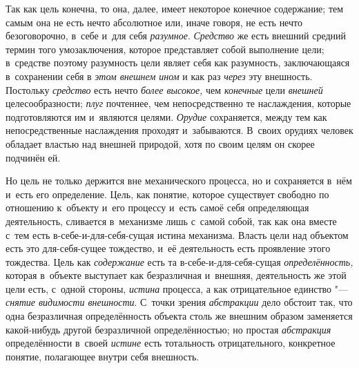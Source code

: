 Так как цель конечна, то она, далее, имеет некоторое конечное
содержание; тем самым она не есть нечто абсолютное или, иначе говоря, не
есть нечто безоговорочно, в~себе и~для себя
{\em разумное}.
{\em Средство} же есть
внешний средний термин того умозаключения, которое представляет собой
выполнение цели; в~средстве поэтому разумность цели являет себя как
разумность, заключающаяся в~сохранении себя в
{\em этом внешнем ином}
и как раз {\em через}
эту внешность. Постольку
{\em средство} есть нечто
{\em более высокое,} чем
{\em конечные} цели
{\em внешней}
целесообразности;
{\em плуг} почтеннее, чем
непосредственно те наслаждения, которые подготовляются им и~являются
целями. {\em Орудие}
сохраняется, между тем как непосредственные наслаждения
проходят и~забываются. В~своих орудиях человек обладает властью над внешней
природой, хотя по своим целям он скорее подчинён ей.

Но цель не только держится вне механического процесса, но и
сохраняется в~нём и~есть его определение. Цель, как понятие, которое
существует свободно по отношению к~объекту и~его процессу и~есть самоё себя
определяющая деятельность, сливается в~механизме лишь с~самой собой, так
как она вместе с~тем есть в-себе-и-для-себя-сущая истина механизма. Власть
цели над объектом есть это для-себя-сущее тождество, и~её деятельность есть
проявление этого тождества. Цель как
{\em содержание} есть та
в-себе-и-для-себя-сущая
{\em определённость,}
которая в~объекте выступает как безразличная и~внешняя,
деятельность же этой цели есть, с~одной стороны,
{\em истина} процесса, а
как отрицательное единство "--- {\em снятие
видимости внешности}. С~точки зрения
{\em абстракции} дело
обстоит так, что одна безразличная определённость объекта столь же внешним
образом заменяется какой-нибудь другой безразличной определённостью; но
простая {\em абстракция}
определённости в~своей
{\em истине} есть
тотальность отрицательного, конкретное понятие, полагающее внутри себя
внешность.

